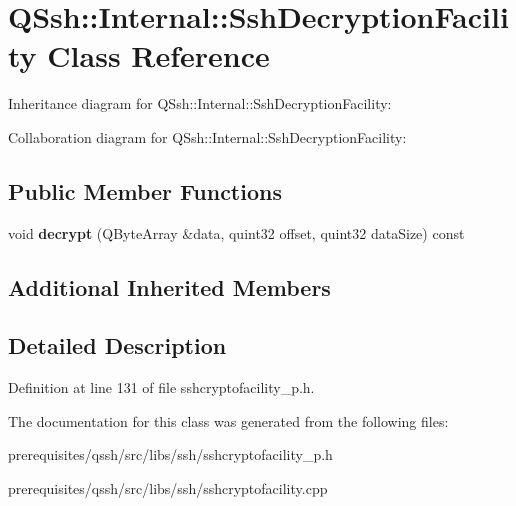 \hypertarget{class_q_ssh_1_1_internal_1_1_ssh_decryption_facility}{}\section{Q\+Ssh\+:\+:Internal\+:\+:Ssh\+Decryption\+Facility Class Reference}
\label{class_q_ssh_1_1_internal_1_1_ssh_decryption_facility}


Inheritance diagram for Q\+Ssh\+:\+:Internal\+:\+:Ssh\+Decryption\+Facility\+:


Collaboration diagram for Q\+Ssh\+:\+:Internal\+:\+:Ssh\+Decryption\+Facility\+:
\subsection*{Public Member Functions}
\begin{DoxyCompactItemize}
\item 
\mbox{\label{class_q_ssh_1_1_internal_1_1_ssh_decryption_facility_a232de3ae5c0d1d72f8c74f613dd62fb2}} 
void {\bfseries decrypt} (Q\+Byte\+Array \&data, quint32 offset, quint32 data\+Size) const
\end{DoxyCompactItemize}
\subsection*{Additional Inherited Members}


\subsection{Detailed Description}


Definition at line 131 of file sshcryptofacility\+\_\+p.\+h.



The documentation for this class was generated from the following files\+:\begin{DoxyCompactItemize}
\item 
prerequisites/qssh/src/libs/ssh/sshcryptofacility\+\_\+p.\+h\item 
prerequisites/qssh/src/libs/ssh/sshcryptofacility.\+cpp\end{DoxyCompactItemize}
